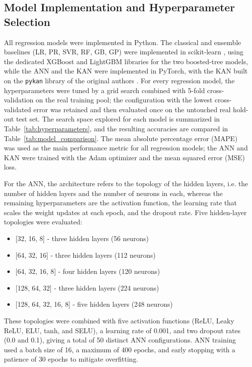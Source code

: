 \documentclass[journal,article,submit,pdftex,moreauthors]{Definitions/mdpi}
\begin{document}
\subsection{Model Implementation and Hyperparameter Selection}


All regression models were implemented in Python. The classical and ensemble baselines (LR, PR, SVR, RF, GB, GP) were implemented in scikit-learn \cite{pedregosa2011scikit}, using the dedicated XGBoost and LightGBM libraries for the two boosted-tree models, while the ANN and the KAN were implemented in PyTorch, with the KAN built on the \texttt{pykan} library of the original authors \cite{liu2025kan}. For every regression model, the hyperparameters were tuned by a grid search combined with 5-fold cross-validation on the real training pool; the configuration with the lowest cross-validated error was retained and then evaluated once on the untouched real hold-out test set. The search space explored for each model is summarized in Table~\ref{tab:hyperparameters}, and the resulting accuracies are compared in Table~\ref{tab:model_comparison}. The mean absolute percentage error (MAPE) was used as the main performance metric for all regression models; the ANN and KAN were trained with the Adam optimizer and the mean squared error (MSE) loss.

For the ANN, the architecture refers to the topology of the hidden layers, i.e. the number of hidden layers and the number of neurons in each, whereas the remaining hyperparameters are the activation function, the learning rate that scales the weight updates at each epoch, and the dropout rate. Five hidden-layer topologies were evaluated:

\begin{itemize}
  \item {[}32, 16, 8{]} - three hidden layers (56 neurons)
  \item {[}64, 32, 16{]} - three hidden layers (112 neurons)
  \item {[}64, 32, 16, 8{]} - four hidden layers (120 neurons)
  \item {[}128, 64, 32{]} - three hidden layers (224 neurons)
  \item {[}128, 64, 32, 16, 8{]} - five hidden layers (248 neurons)
\end{itemize}


These topologies were combined with five activation functions (ReLU, Leaky ReLU, ELU, tanh, and SELU), a learning rate of 0.001, and two dropout rates (0.0 and 0.1), giving a total of 50 distinct ANN configurations. ANN training used a batch size of 16, a maximum of 400 epochs, and early stopping with a patience of 30 epochs to mitigate overfitting.
\end{document}
